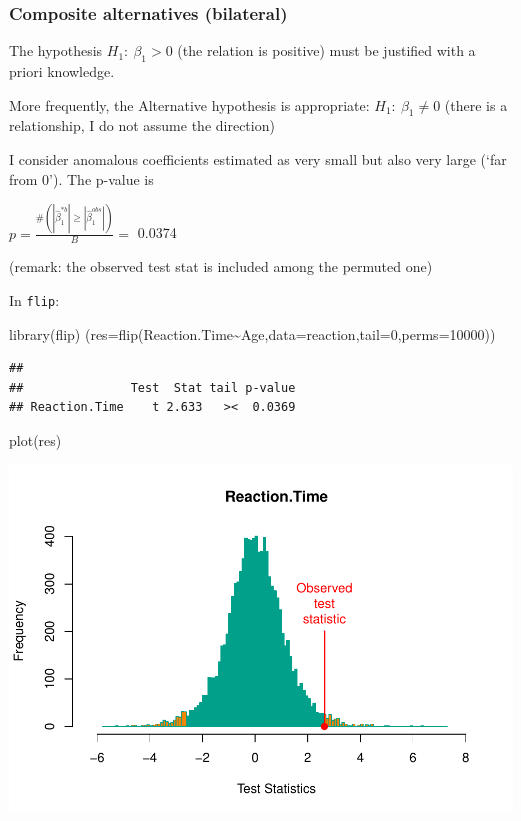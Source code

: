 \documentclass[
]{article}
\newenvironment{Shaded}{\begin{snugshade}}{\end{snugshade}}
\newcommand{\AttributeTok}[1]{\textcolor[rgb]{0.77,0.63,0.00}{#1}}
\newcommand{\DecValTok}[1]{\textcolor[rgb]{0.00,0.00,0.81}{#1}}
\newcommand{\FunctionTok}[1]{\textcolor[rgb]{0.00,0.00,0.00}{#1}}
\newcommand{\NormalTok}[1]{#1}
\newcommand{\SpecialCharTok}[1]{\textcolor[rgb]{0.00,0.00,0.00}{#1}}
\begin{document}
\hypertarget{composite-alternatives-bilateral}{%
\subsubsection{Composite alternatives
(bilateral)}\label{composite-alternatives-bilateral}}

The hypothesis \(H_1: \ \beta_1 >0\) (the relation is positive) must be
justified with a priori knowledge.

More frequently, the Alternative hypothesis is appropriate:
\(H_1: \ \beta_1 \neq 0\) (there is a relationship, I do not assume the
direction)

I consider anomalous coefficients estimated as very small but also very
large (`far from 0'). The p-value is

\(p=\frac{\#(|\hat{\beta}_1^{*b} | \geq|\hat{\beta}_1^{obs}|)}{B}=\)
0.0374

(remark: the observed test stat is included among the permuted one)

In \texttt{flip}:

\begin{Shaded}
\begin{Highlighting}[]
\FunctionTok{library}\NormalTok{(flip)}
\NormalTok{(}\AttributeTok{res=}\FunctionTok{flip}\NormalTok{(Reaction.Time}\SpecialCharTok{\textasciitilde{}}\NormalTok{Age,}\AttributeTok{data=}\NormalTok{reaction,}\AttributeTok{tail=}\DecValTok{0}\NormalTok{,}\AttributeTok{perms=}\DecValTok{10000}\NormalTok{))}
\end{Highlighting}
\end{Shaded}

\begin{verbatim}
## 
##               Test  Stat tail p-value
## Reaction.Time    t 2.633   ><  0.0369
\end{verbatim}

\begin{Shaded}
\begin{Highlighting}[]
\FunctionTok{plot}\NormalTok{(res)}
\end{Highlighting}
\end{Shaded}

\begin{center}\includegraphics{perm_files/figure-latex/unnamed-chunk-16-1} \end{center}
\end{document}
